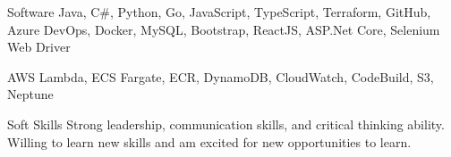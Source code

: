 


\begin{cvskills}


\cvskill
{Software} %
{Java, C\#, Python, Go, JavaScript, TypeScript, Terraform, GitHub, Azure DevOps, Docker, MySQL, Bootstrap, ReactJS, ASP.Net Core, Selenium Web Driver} %


\cvskill
{AWS} %
{Lambda, ECS Fargate, ECR, DynamoDB, CloudWatch, CodeBuild, S3, Neptune} %


\cvskill
{Soft Skills} %
{Strong leadership, communication skills, and critical thinking ability. Willing to learn new skills and am excited for new opportunities to learn.}

\end{cvskills}